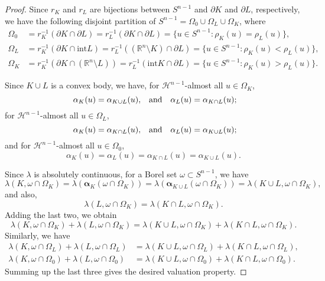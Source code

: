\documentclass{cpamart1}     %
\theoremstyle{definition}
\theoremstyle{remark}
\newcommand{\rn}{\mathbb R^n}
\newcommand{\sn}{S^{n-1}}
\newcommand{\balpha}{\pmb{\alpha}}
\newcommand{\hm}{\mathcal H^{n-1}}
\begin{document}
\begin{proof}
Since $r_K$ and $r_L$ are bijections between $\sn$ and $\partial K$ and $\partial L$, respectively,
we have the following disjoint partition of $\sn = \Omega_0 \cup \Omega_L \cup \Omega_K$, where
\begin{align*}
\Omega_0 &= r_K^{-1}(\partial K \cap \partial L)
= r_L^{-1}(\partial K \cap \partial L)
=\{ u\in\sn: \rho_K(u)=\rho_L(u) \}, \\
\Omega_L &= r_K^{-1}(\partial K \cap \text{int} L)
= r_L^{-1}((\rn\setminus K) \cap \partial L)
=\{ u\in\sn: \rho_K(u) < \rho_L(u) \},  \\
\Omega_K &= r_K^{-1}(\partial K \cap (\rn\setminus L))
= r_L^{-1}(\text{int} K \cap \partial L)
=\{ u\in\sn: \rho_K(u) > \rho_L(u) \}.
\end{align*}

Since $K\cup L$ is a convex body, we have,
for $\hm$-almost all $u\in \Omega_K$,
\[
\text{
$\alpha_K(u)=\alpha_{K\cup L}(u),$\quad and\quad  $\alpha_L(u)=\alpha_{K\cap L}(u)$};
\]
for $\hm$-almost all $u\in \Omega_L $,
\[
\text{
$
\alpha_K(u)=\alpha_{K\cap L}(u)$,\quad and\quad $\alpha_L(u)=\alpha_{K\cup L}(u)$};
\]
and for $\hm$-almost all $u \in \Omega_0$,
\[
\alpha_K(u)=\alpha_L(u)=\alpha_{K\cap L}(u) = \alpha_{K\cup L}(u).
\]

Since $\lambda$ is absolutely continuous, for a Borel set $\omega \subset \sn$, we have
\[
\lambda(K,\omega\cap \Omega_K) = \lambda(\balpha_K(\omega\cap \Omega_K))
=\lambda(\balpha_{K\cup L} (\omega\cap \Omega_K)) = \lambda(K\cup L,\omega\cap \Omega_K),
\]
and also,
\[
\lambda(L,\omega\cap \Omega_K)=\lambda(K\cap L,\omega\cap \Omega_K).
\]
Adding the last two, we obtain
\[
\lambda(K,\omega\cap \Omega_K) + \lambda(L,\omega\cap \Omega_K)
=\lambda(K\cup L, \omega\cap \Omega_K) + \lambda(K\cap L, \omega\cap \Omega_K).
\]
Similarly, we have
\begin{align*}
\lambda(K,\omega\cap \Omega_L) + \lambda(L,\omega\cap \Omega_L)
&=\lambda(K\cup L,\omega\cap \Omega_L) + \lambda(K\cap L,\omega\cap \Omega_L), \\
\lambda(K,\omega\cap \Omega_0) + \lambda(L,\omega\cap \Omega_0)
&=\lambda(K\cup L,\omega\cap \Omega_0) + \lambda(K\cap L,\omega\cap \Omega_0).
\end{align*}
Summing up the last three gives the desired valuation property.
\end{proof}
\end{document}
